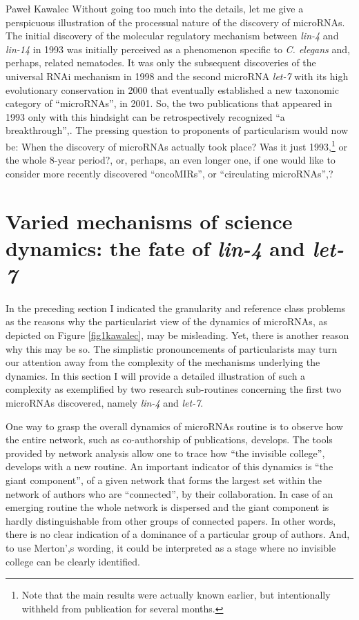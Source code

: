 \begin{artengenv}{Paweł Kawalec}
Without going too much into the details, let me give a perspicuous illustration of the processual nature of the discovery of microRNAs. The initial discovery of the molecular regulatory mechanism between \textit{lin-4} and \textit{lin-14} in 1993 was initially perceived as a phenomenon specific to \textit{C. elegans} and, perhaps, related nematodes. It was only the subsequent discoveries of the universal RNAi mechanism in 1998 and the second microRNA \textit{let-7} with its high evolutionary conservation in 2000 that eventually established a new taxonomic category of ``microRNAs'', in 2001. So, the two publications that appeared in 1993 only with this hindsight can be retrospectively recognized ``a breakthrough'',. The pressing question to proponents of particularism would now be: When the discovery of microRNAs actually took place? Was it just 1993,\footnote{Note that the main results were actually known earlier, but intentionally withheld from publication for several months.} or the whole 8-year period?, or, perhaps, an even longer one, if one would like to consider more recently discovered ``oncoMIRs'', or ``circulating microRNAs'',?

\section{Varied mechanisms of science dynamics: the fate of \textit{lin-4} and \textit{let-7}}
In the preceding section I indicated the granularity and reference class problems as the reasons why the particularist view of the dynamics of microRNAs, as depicted on Figure \ref{fig1kawalec}, may be misleading. Yet, there is another reason why this may be so. The simplistic pronouncements of particularists may turn our attention away from the complexity of the mechanisms underlying the dynamics. In this section I will provide a detailed illustration of such a complexity as exemplified by two research sub-routines concerning the first two microRNAs discovered, namely \textit{lin-4} and \textit{let-7}.

One way to grasp the overall dynamics of microRNAs routine is to observe how the entire network, such as co-authorship of publications, develops. The tools provided by network analysis allow one to trace how ``the invisible college'',
\parencite[][pp.viii–ix]{merton_foreword_1986} %
 develops with a new routine. An important indicator of this dynamics is ``the giant component'', of a given network that forms the largest set within the network of authors who are ``connected'', by their collaboration. In case of an emerging routine the whole network is dispersed and the giant component is hardly distinguishable from other groups of connected papers. In other words, there is no clear indication of a dominance of a particular group of authors. And, to use Merton',s wording, it could be interpreted as a stage where no invisible college can be clearly identified.


\end{artengenv}
